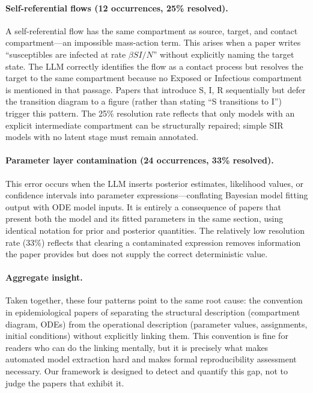 \paragraph{Self-referential flows (12 occurrences, 25\% resolved).}
A self-referential flow has the same compartment as source, target, and contact
compartment---an impossible mass-action term. This arises when a paper writes
``susceptibles are infected at rate $\beta S I / N$'' without explicitly naming the target
state. The LLM correctly identifies the flow as a contact process but resolves the target
to the same compartment because no Exposed or Infectious compartment is mentioned in
that passage. Papers that introduce S, I, R sequentially but defer the transition
diagram to a figure (rather than stating ``S transitions to I'') trigger this pattern.
The 25\% resolution rate reflects that only models with an explicit intermediate
compartment can be structurally repaired; simple SIR models with no latent stage must
remain annotated.

\paragraph{Parameter layer contamination (24 occurrences, 33\% resolved).}
This error occurs when the LLM inserts posterior estimates, likelihood values, or
confidence intervals into parameter expressions---conflating Bayesian model fitting
output with ODE model inputs. It is entirely a consequence of papers that present
both the model and its fitted parameters in the same section, using identical notation
for prior and posterior quantities. The relatively low resolution rate (33\%) reflects
that clearing a contaminated expression removes information the paper provides but
does not supply the correct deterministic value.

\paragraph{Aggregate insight.}
Taken together, these four patterns point to the same root cause: the convention in
epidemiological papers of separating the structural description (compartment diagram,
ODEs) from the operational description (parameter values, assignments, initial conditions)
without explicitly linking them. This convention is fine for readers who can do the
linking mentally, but it is precisely what makes automated model extraction hard and
makes formal reproducibility assessment necessary. Our framework is designed to detect
and quantify this gap, not to judge the papers that exhibit it.

